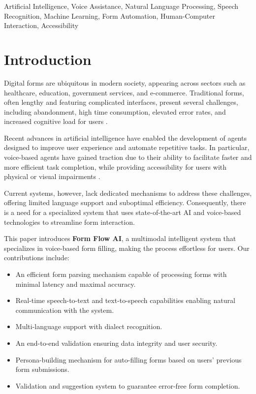 \documentclass[conference]{IEEEtran}
\begin{document}
\begin{IEEEkeywords}
Artificial Intelligence, Voice Assistance, Natural Language Processing, Speech Recognition, Machine Learning, Form Automation, Human-Computer Interaction, Accessibility
\end{IEEEkeywords}

\section{Introduction}

Digital forms are ubiquitous in modern society, appearing across sectors such as healthcare, education, government services, and e-commerce. Traditional forms, often lengthy and featuring complicated interfaces, present several challenges, including abandonment, high time consumption, elevated error rates, and increased cognitive load for users \cite{b1}.

Recent advances in artificial intelligence have enabled the development of agents designed to improve user experience and automate repetitive tasks. In particular, voice-based agents have gained traction due to their ability to facilitate faster and more efficient task completion, while providing accessibility for users with physical or visual impairments \cite{b2}.

Current systems, however, lack dedicated mechanisms to address these challenges, offering limited language support and suboptimal efficiency. Consequently, there is a need for a specialized system that uses state-of-the-art AI and voice-based technologies to streamline form interaction.

This paper introduces \textbf{Form Flow AI}, a multimodal intelligent system that specializes in voice-based form filling, making the process effortless for users. Our contributions include:

\begin{itemize}
    \item An efficient form parsing mechanism capable of processing forms with minimal latency and maximal accuracy.
    \item Real-time speech-to-text and text-to-speech capabilities enabling natural communication with the system.
    \item Multi-language support with dialect recognition.
    \item An end-to-end validation ensuring data integrity and user security.
    \item Persona-building mechanism for auto-filling forms based on users' previous form submissions.
    \item Validation and suggestion system to guarantee error-free form completion.
\end{itemize}
\end{document}
